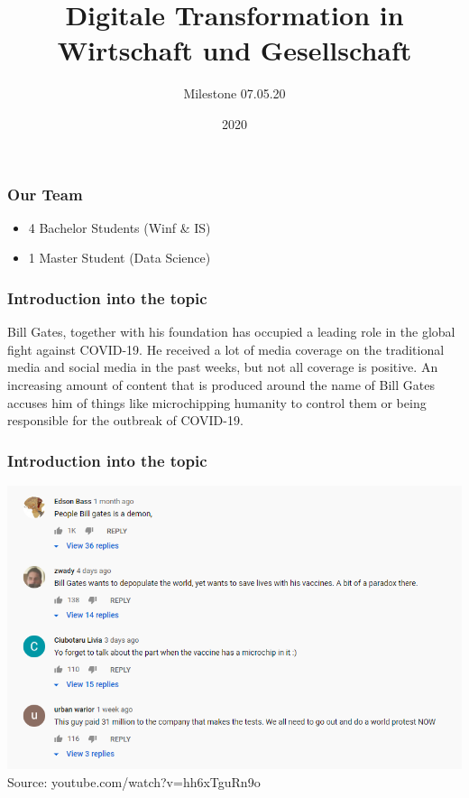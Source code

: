 \documentclass{beamer}
\title{Digitale Transformation in Wirtschaft und Gesellschaft}
\author{Milestone 07.05.20}
\institute{University of Bamberg/ University Konstanz}
\date{2020}
\begin{document}
\frame{\titlepage}

\begin{frame}
\frametitle{Our Team}

\begin{itemize}
	\item 4 Bachelor Students (Winf \& IS) 
	\item 1 Master Student  (Data Science)
\end{itemize}




\end{frame}


\begin{frame}
\frametitle{Introduction into the topic}
 Bill Gates, together with his foundation has occupied a leading role in the global fight against COVID-19. He received a lot of media coverage on the traditional media and social media in the past weeks, but not all coverage is positive. An increasing amount of content that is produced around the name of Bill Gates accuses him of things like microchipping humanity to control them or being responsible for the outbreak of COVID-19.
\end{frame}	

\begin{frame}
\frametitle{Introduction into the topic}
\includegraphics[height=0.7\textheight]{BillGatesvaccines}
Source: youtube.com/watch?v=hh6xTguRn9o
\end{frame}	
\end{document}
